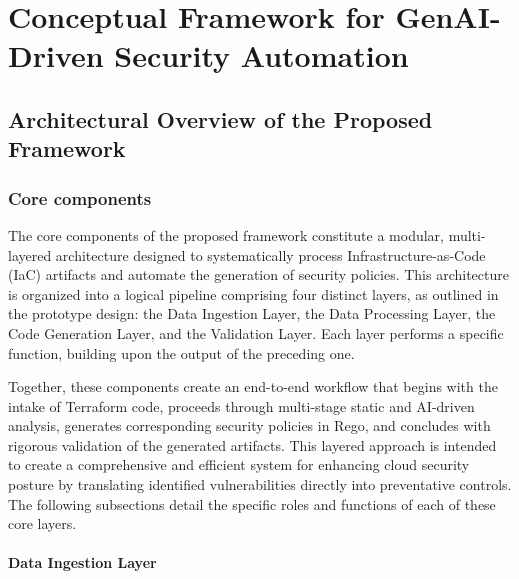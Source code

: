 
\chapter{Conceptual Framework for GenAI-Driven Security Automation} %

\section{Architectural Overview of the Proposed Framework}


\subsection{Core components} %
\label{sub:Core components}

The core components of the proposed framework constitute a modular, multi-layered architecture designed to systematically process Infrastructure-as-Code (IaC) artifacts and automate the generation of security policies. This architecture is organized into a logical pipeline comprising four distinct layers, as outlined in the prototype design: the Data Ingestion Layer, the Data Processing Layer, the Code Generation Layer, and the Validation Layer. Each layer performs a specific function, building upon the output of the preceding one.

Together, these components create an end-to-end workflow that begins with the intake of Terraform code, proceeds through multi-stage static and AI-driven analysis, generates corresponding security policies in Rego, and concludes with rigorous validation of the generated artifacts. This layered approach is intended to create a comprehensive and efficient system for enhancing cloud security posture by translating identified vulnerabilities directly into preventative controls. The following subsections detail the specific roles and functions of each of these core layers.

\subsubsection{Data Ingestion Layer} %
\label{sec:Data Ingestion Layer}

